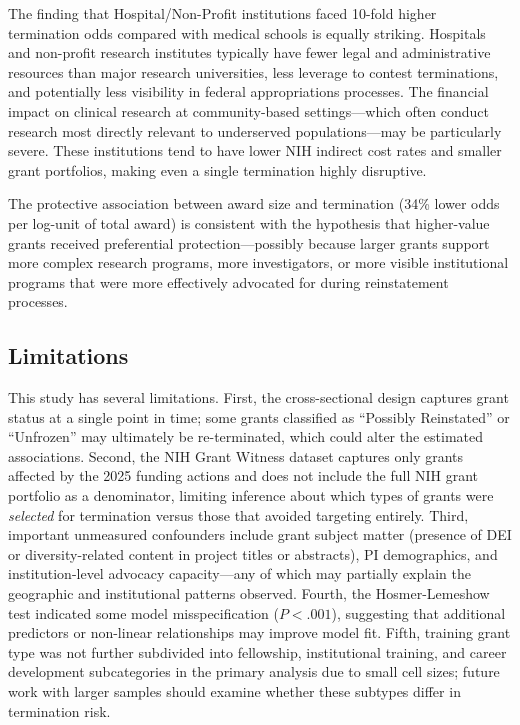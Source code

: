 \documentclass[10pt, letterpaper]{article}
\begin{document}
The finding that Hospital/Non-Profit institutions faced 10-fold higher termination odds compared with medical schools is equally striking. Hospitals and non-profit research institutes typically have fewer legal and administrative resources than major research universities, less leverage to contest terminations, and potentially less visibility in federal appropriations processes. The financial impact on clinical research at community-based settings---which often conduct research most directly relevant to underserved populations---may be particularly severe.\cite{Jalali2025} These institutions tend to have lower NIH indirect cost rates and smaller grant portfolios, making even a single termination highly disruptive.

The protective association between award size and termination (34\% lower odds per log-unit of total award) is consistent with the hypothesis that higher-value grants received preferential protection---possibly because larger grants support more complex research programs, more investigators, or more visible institutional programs that were more effectively advocated for during reinstatement processes.

\subsection*{Limitations}

This study has several limitations. First, the cross-sectional design captures grant status at a single point in time; some grants classified as ``Possibly Reinstated'' or ``Unfrozen'' may ultimately be re-terminated, which could alter the estimated associations. Second, the NIH Grant Witness dataset captures only grants affected by the 2025 funding actions and does not include the full NIH grant portfolio as a denominator, limiting inference about which types of grants were \textit{selected} for termination versus those that avoided targeting entirely. Third, important unmeasured confounders include grant subject matter (presence of DEI or diversity-related content in project titles or abstracts), PI demographics, and institution-level advocacy capacity---any of which may partially explain the geographic and institutional patterns observed. Fourth, the Hosmer-Lemeshow test indicated some model misspecification ($P < .001$), suggesting that additional predictors or non-linear relationships may improve model fit. Fifth, training grant type was not further subdivided into fellowship, institutional training, and career development subcategories in the primary analysis due to small cell sizes; future work with larger samples should examine whether these subtypes differ in termination risk.
\end{document}
